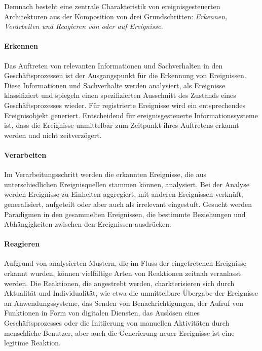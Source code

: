 Demnach besteht eine zentrale Charakteristik von ereignisgesteuerten Architekturen aus der Komposition von drei Grundschritten: \textit{Erkennen, Verarbeiten und Reagieren von oder auf Ereignisse.}

\paragraph{Erkennen} 
Das Auftreten von relevanten Informationen und Sachverhalten in  den Geschäftsprozessen ist der Ausgangspunkt für die Erkennung von Ereignissen.
Diese Informationen und Sachverhalte werden analysiert, als Ereignisse klassifiziert und spiegeln einen spezifizierten Ausschnitt des Zustands eines Geschäftsprozesses wieder. 
Für registrierte Ereignisse wird ein entsprechendes Ereignisobjekt generiert.
Entscheidend für ereignisgesteuerte Informationssysteme ist, dass die Ereignisse unmittelbar zum Zeitpunkt ihres Auftretens erkannt werden und nicht zeitverzögert.
\cite{Bruns.2010}

\paragraph{Verarbeiten}
Im Verarbeitungsschritt werden die erkannten Ereignisse, die aus unterschiedlichen Ereignisquellen stammen können, analysiert. Bei der Analyse werden Ereignisse zu Einheiten aggregiert, mit anderen Ereignissen verknüft, generalisiert, aufgeteilt oder aber auch als irrelevant eingestuft. 
Gesucht werden Paradigmen in den gesammelten Ereignissen, die bestimmte Beziehungen und Abhängigkeiten zwischen den Ereignissen ausdrücken.
\cite{Hedtstuck.2017}

\paragraph{Reagieren}
Aufgrund von analysierten Mustern, die im Fluss der eingetretenen Ereignisse erkannt wurden, können vielfältige Arten von Reaktionen zeitnah veranlasst werden. 
Die Reaktionen, die angestrebt werden, charkterisieren sich durch Aktualität und Individualität, wie etwa die unmittelbare Übergabe der Ereignisse an Anwendungssysteme, das Senden von Benachrichtigungen, der Aufruf von Funktionen in Form von digitalen Diensten, das Auslösen eines Geschäftsprozesses oder die Initiierung von manuellen Aktivitäten durch menschliche Benutzer, aber auch die Generierung neuer Ereignisse ist eine legitime Reaktion.
\cite{Bruns.2010}

